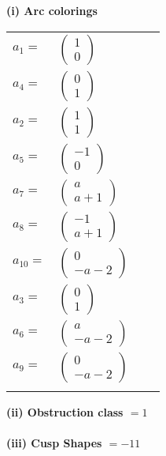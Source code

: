 \documentclass[1p]{elsarticle_modified}
\theoremstyle{definition}
\begin{document}
\flushleft \textbf{(i) Arc colorings}\\
\begin{tabular}{m{7pt} m{180pt} m{7pt} m{180pt} }
\flushright $a_{1}=$&$\begin{pmatrix}1\\0\end{pmatrix}$ \\
\flushright $a_{4}=$&$\begin{pmatrix}0\\1\end{pmatrix}$ \\
\flushright $a_{2}=$&$\begin{pmatrix}1\\1\end{pmatrix}$ \\
\flushright $a_{5}=$&$\begin{pmatrix}-1\\0\end{pmatrix}$ \\
\flushright $a_{7}=$&$\begin{pmatrix}a\\a+1\end{pmatrix}$ \\
\flushright $a_{8}=$&$\begin{pmatrix}-1\\a+1\end{pmatrix}$ \\
\flushright $a_{10}=$&$\begin{pmatrix}0\\- a-2\end{pmatrix}$ \\
\flushright $a_{3}=$&$\begin{pmatrix}0\\1\end{pmatrix}$ \\
\flushright $a_{6}=$&$\begin{pmatrix}a\\- a-2\end{pmatrix}$ \\
\flushright $a_{9}=$&$\begin{pmatrix}0\\- a-2\end{pmatrix}$\\&\end{tabular}
\flushleft \textbf{(ii) Obstruction class $= 1$}\\~\\
\flushleft \textbf{(iii) Cusp Shapes $= -11$}\\~\\
\end{document}
